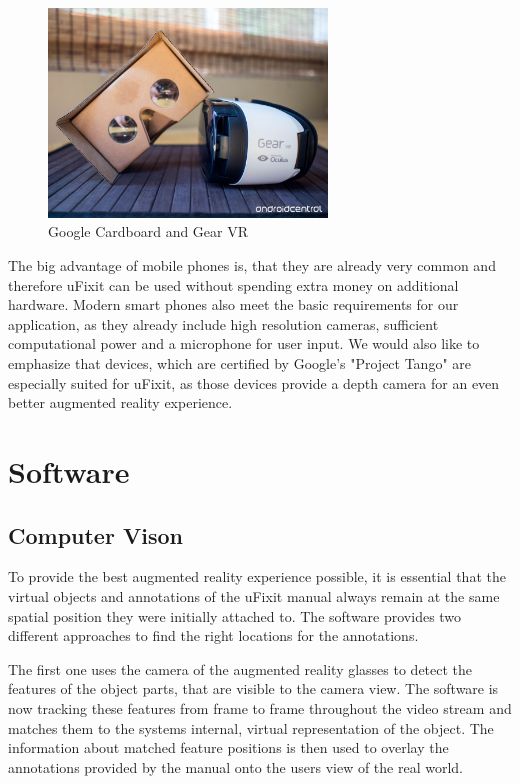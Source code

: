 \begin{figure}[H]
		\includegraphics[width=0.66\textwidth]{../images/googleCarboard.jpg}
		\centering
		\caption{Google Cardboard and Gear VR}
		\label{fig:cardBoard}
\end{figure}

The big advantage of mobile phones is, that they are already very common and therefore uFixit can be used  without spending extra money on additional hardware. Modern smart phones also meet the basic requirements for our application, as they already include high resolution cameras, sufficient computational power and a microphone for user input. We would also like to emphasize that devices, which are certified by Google's "Project Tango" are especially suited for uFixit, as those devices provide a depth camera for an even better augmented reality experience.
				

\section{Software}
\subsection{Computer Vison}
To provide the best augmented reality experience possible, it is essential that the virtual objects and annotations of the uFixit manual always remain at the same spatial position they were initially attached to. The software provides two different approaches to find the right locations for the annotations.

The first one uses the camera of the augmented reality glasses to detect the features of the object parts, that are visible to the camera view. The software is now tracking these features from frame to frame throughout the video stream and matches them to the systems internal,  virtual representation of the object. The information about matched feature positions is then used to overlay the annotations provided by the manual onto the users view of the real world.

